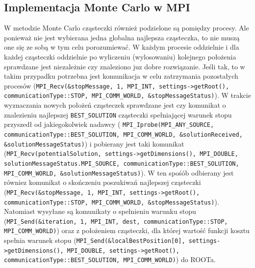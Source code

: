 \documentclass[11pt, a4paper, oneside]{article}
\begin{document}
\subsection{Implementacja Monte Carlo w MPI}

W metodzie Monte Carlo cząsteczki również podzielone są pomiędzy procesy. Ale ponieważ nie jest wybierana jedna globalna najlepsza cząsteczka, to nie muszą one się ze sobą w tym celu porozumiewać. W każdym procesie oddzielnie i dla każdej cząsteczki oddzielnie po wyliczeniu (wylosowaniu) kolejnego położenia sprawdzane jest niezależnie czy znaleziono juz dobre rozwiązanie. Jeśli tak, to w takim przypadku potrzebna jest komunikacja w celu zatrzymania pozostałych procesów (\lstinline[style=mycpp]{MPI_Recv(&stopMessage, 1, MPI_INT, settings->getRoot(), communicationType::STOP, MPI_COMM_WORLD, &stopMessageStatus)}). W trakcie wyznaczania nowych położeń cząsteczek sprawdzane jest czy komunikat o znalezieniu najlepszej \lstinline[style=mycpp]{BEST_SOLUTION} cząsteczki spełniającej warunek stopu przyszedł od jakiegokolwiek nadawcy ( \lstinline[style=mycpp]{MPI_Iprobe(MPI_ANY_SOURCE, communicationType::BEST_SOLUTION, MPI_COMM_WORLD, &solutionReceived, &solutionMessageStatus)}) i pobierany jest taki komunikat (\lstinline[style=mycpp]{MPI_Recv(potentialSolution, settings->getDimensions(), MPI_DOUBLE, solutionMessageStatus.MPI_SOURCE, communicationType::BEST_SOLUTION, MPI_COMM_WORLD, &solutionMessageStatus)}). W ten spośób odbierany jest równiez komunikat o skończeniu poszukiwań najlepszej cząsteczki (\lstinline[style=mycpp]{MPI_Recv(&stopMessage, 1, MPI_INT, settings->getRoot(), communicationType::STOP, MPI_COMM_WORLD, &stopMessageStatus)}). Natomiast wysyłane są komunikaty o spełnieniu warunku stopu (\lstinline[style=mycpp]{MPI_Send(&iteration, 1, MPI_INT, dest, communicationType::STOP, MPI_COMM_WORLD)}) oraz z położeniem cząsteczki, dla której wartość funkcji kosztu spełnia warunek stopu (\lstinline[style=mycpp]{MPI_Send(&localBestPosition[0], settings->getDimensions(), MPI_DOUBLE, settings->getRoot(), communicationType::BEST_SOLUTION, MPI_COMM_WORLD)}) do ROOTa.
                    
\end{document}
